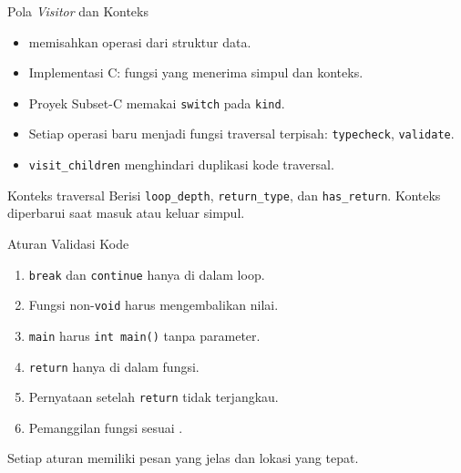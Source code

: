 \documentclass[aspectratio=169,10pt,t]{beamer}
\begin{document}
\begin{frame}{Pola \textit{Visitor} dan Konteks}
  \begin{itemize}
    \item {} memisahkan operasi dari struktur data.
    \item Implementasi C: fungsi yang menerima simpul dan konteks.
    \item Proyek Subset-C memakai \texttt{switch} pada \texttt{kind}.
    \item Setiap operasi baru menjadi fungsi traversal terpisah:
          \texttt{typecheck}, \texttt{validate}.
    \item \texttt{visit\_children} menghindari duplikasi kode
          traversal.
  \end{itemize}

  \vspace{4pt}
  \begin{block}{Konteks traversal}
    \footnotesize
    Berisi \texttt{loop\_depth}, \texttt{return\_type}, dan
    \texttt{has\_return}. Konteks diperbarui saat masuk atau keluar
    simpul.
  \end{block}
\end{frame}

\begin{frame}{Aturan Validasi Kode}
  \begin{enumerate}
    \setlength{\itemsep}{2pt}
    \item \texttt{break} dan \texttt{continue} hanya di dalam loop.
    \item Fungsi non-\texttt{void} harus mengembalikan nilai.
    \item \texttt{main} harus \texttt{int main()} tanpa parameter.
    \item \texttt{return} hanya di dalam fungsi.
    \item Pernyataan setelah \texttt{return} tidak terjangkau.
    \item Pemanggilan fungsi sesuai .
  \end{enumerate}

  \vspace{3pt}
  {\footnotesize\color{ubbblue!80}Setiap aturan memiliki pesan yang
  jelas dan lokasi yang tepat.}
\end{frame}
\end{document}
